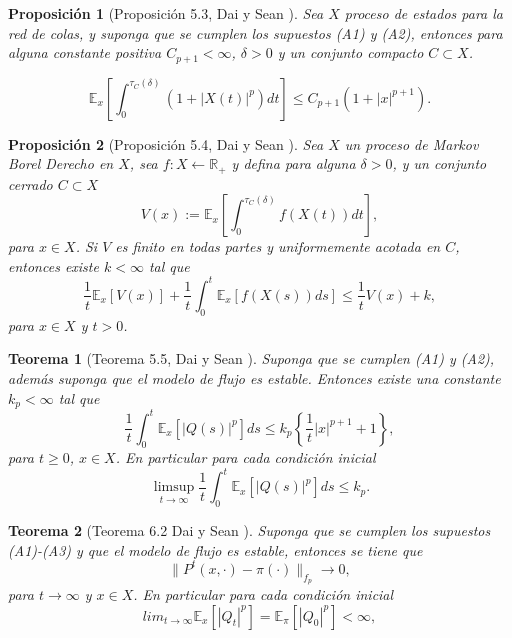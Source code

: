 \documentclass{article}
\newtheorem{Teo}{Teorema}[section]
\newtheorem{Prop}{Proposición}[section]
\newcommand{\rea}{\mathbb{R}}
\newcommand{\esp}{\mathbb{E}}
\numberwithin{equation}{section}
\begin{document}
\begin{Prop}[Proposici\'on 5.3, Dai y Sean \cite{DaiSean}]\label{Prop.5.3.DaiSean}
Sea $X$ proceso de estados para la red de colas, y suponga que se
cumplen los supuestos (A1) y (A2), entonces para alguna constante
positiva $C_{p+1}<\infty$, $\delta>0$ y un conjunto compacto
$C\subset X$.

\begin{equation}\label{Eq.5.4}
\esp_{x}\left[\int_{0}^{\tau_{C}\left(\delta\right)}\left(1+|X\left(t\right)|^{p}\right)dt\right]\leq
C_{p+1}\left(1+|x|^{p+1}\right).
\end{equation}
\end{Prop}

\begin{Prop}[Proposici\'on 5.4, Dai y Sean \cite{DaiSean}]\label{Prop.5.4.DaiSean}
Sea $X$ un proceso de Markov Borel Derecho en $X$, sea
$f:X\leftarrow\rea_{+}$ y defina para alguna $\delta>0$, y un
conjunto cerrado $C\subset X$
\[V\left(x\right):=\esp_{x}\left[\int_{0}^{\tau_{C}\left(\delta\right)}f\left(X\left(t\right)\right)dt\right],\]
para $x\in X$. Si $V$ es finito en todas partes y uniformemente
acotada en $C$, entonces existe $k<\infty$ tal que
\begin{equation}\label{Eq.5.11}
\frac{1}{t}\esp_{x}\left[V\left(x\right)\right]+\frac{1}{t}\int_{0}^{t}\esp_{x}\left[f\left(X\left(s\right)\right)ds\right]\leq\frac{1}{t}V\left(x\right)+k,
\end{equation}
para $x\in X$ y $t>0$.
\end{Prop}


\begin{Teo}[Teorema 5.5, Dai y Sean  \cite{DaiSean}]
Suponga que se cumplen (A1) y (A2), adem\'as suponga que el modelo
de flujo es estable. Entonces existe una constante $k_{p}<\infty$
tal que
\begin{equation}\label{Eq.5.13}
\frac{1}{t}\int_{0}^{t}\esp_{x}\left[|Q\left(s\right)|^{p}\right]ds\leq
k_{p}\left\{\frac{1}{t}|x|^{p+1}+1\right\},
\end{equation}
para $t\geq0$, $x\in X$. En particular para cada condici\'on
inicial
\begin{equation}\label{Eq.5.14}
\limsup_{t\rightarrow\infty}\frac{1}{t}\int_{0}^{t}\esp_{x}\left[|Q\left(s\right)|^{p}\right]ds\leq
k_{p}.
\end{equation}
\end{Teo}

\begin{Teo}[Teorema 6.2 Dai y Sean \cite{DaiSean}]\label{Tma.6.2}
Suponga que se cumplen los supuestos (A1)-(A3) y que el modelo de
flujo es estable, entonces se tiene que
\[\parallel P^{t}\left(x,\cdot\right)-\pi\left(\cdot\right)\parallel_{f_{p}}\rightarrow0,\]
para $t\rightarrow\infty$ y $x\in X$. En particular para cada
condici\'on inicial
\[lim_{t\rightarrow\infty}\esp_{x}\left[\left|Q_{t}\right|^{p}\right]=\esp_{\pi}\left[\left|Q_{0}\right|^{p}\right]<\infty,\]
\end{Teo}
\end{document}

